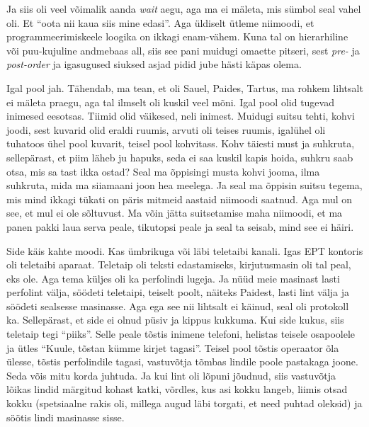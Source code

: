 Ja siis oli veel võimalik aanda \emph{wait} aegu, aga ma ei mäleta, mis sümbol seal vahel oli. Et \enquote{oota nii kaua siis mine edasi}. Aga üldiselt ütleme niimoodi, et programmeerimiskeele loogika on ikkagi enam-vähem. Kuna tal on hierarhiline või puu-kujuline andmebaas all, siis see pani muidugi omaette pitseri, sest \emph{pre-} ja \emph{post-order} ja igasugused siuksed asjad pidid jube hästi käpas olema. 


Igal pool jah. Tähendab, ma tean, et oli Sauel, Paides, Tartus, ma rohkem lihtsalt ei mäleta praegu, aga tal ilmselt oli kuskil veel mõni. Igal pool olid tugevad inimesed eesotsas. Tiimid olid väikesed, neli inimest. Muidugi suitsu tehti, kohvi joodi, sest kuvarid olid eraldi ruumis, arvuti oli teises ruumis, igalühel oli tuhatoos ühel pool kuvarit, teisel pool kohvitass. Kohv täiesti must ja suhkruta, sellepärast, et piim läheb ju hapuks, seda ei saa kuskil kapis hoida, suhkru saab otsa, mis sa tast ikka ostad?  Seal ma õppisingi musta kohvi jooma, ilma suhkruta, mida ma siiamaani joon hea meelega. Ja seal ma õppisin suitsu tegema, mis mind ikkagi tükati on päris mitmeid aastaid niimoodi saatnud. Aga mul on see, et mul ei ole sõltuvust. Ma võin jätta suitsetamise maha niimoodi, et ma panen pakki laua serva peale, tikutopsi peale ja seal ta seisab, mind see ei häiri. 


Side käis kahte moodi. Kas ümbrikuga või läbi teletaibi kanali. Igas EPT kontoris oli teletaibi aparaat. Teletaip oli teksti edastamiseks, kirjutusmasin oli tal peal, eks ole. Aga tema küljes oli ka perfolindi lugeja. Ja nüüd meie  masinast lasti perfolint välja, söödeti teletaipi, teiselt poolt,  näiteks Paidest, lasti lint välja ja söödeti sealsesse masinasse. Aga ega see nii lihtsalt ei käinud, seal oli protokoll ka. Sellepärast, et side ei olnud püsiv ja kippus kukkuma. Kui side kukus, siis teletaip tegi \enquote{piiks}. Selle peale tõstis inimene telefoni, helistas teisele osapoolele ja ütles \enquote{Kuule, tõstan kümme kirjet tagasi}. Teisel pool tõstis operaator õla ülesse, tõstis perfolindile tagasi, vastuvõtja tõmbas lindile poole pastakaga joone. Seda võis mitu korda juhtuda. Ja kui lint oli lõpuni jõudnud, siis vastuvõtja lõikas lindid märgitud kohast katki, võrdles, kus asi kokku langeb, liimis otsad kokku (spetsiaalne rakis oli, millega augud läbi torgati, et need puhtad oleksid) ja söötis lindi masinasse sisse. 

